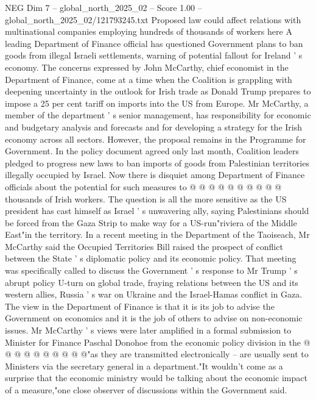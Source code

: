 \begin{textsample}{NEG Dim 7 – global\_north\_2025\_02 – Score 1.00 – global\_north\_2025\_02/121793245.txt}  \label{ex:f7_neg_176}
Proposed law could affect relations with multinational companies employing hundreds of thousands of workers here A leading Department of Finance official has questioned Government plans to ban goods from illegal Israeli settlements, warning of potential fallout for Ireland ' s economy.
The concerns expressed by John McCarthy, chief economist in the Department of Finance, come at a time when the Coalition is grappling with deepening uncertainty in the outlook for Irish trade as Donald Trump prepares to impose a 25 per cent tariff on imports into the US from Europe.
Mr McCarthy, a member of the department ' s senior management, has responsibility for economic and budgetary analysis and forecasts and for developing a strategy for the Irish economy across all sectors.
However, the proposal remains in the Programme for Government.
In the policy document agreed only last month, Coalition leaders pledged to progress new laws to ban imports of goods from Palestinian territories illegally occupied by Israel.
Now there is disquiet among Department of Finance officials about the potential for such measures to @ @ @ @ @ @ @ @ @ @ thousands of Irish workers.
The question is all the more sensitive as the US president has cast himself as Israel ' s unwavering ally, saying Palestinians should be forced from the Gaza Strip to make way for a US-run"riviera of the Middle East"in the territory.
In a recent meeting in the Department of the Taoiseach, Mr McCarthy said the Occupied Territories Bill raised the prospect of conflict between the State ' s diplomatic policy and its economic policy.
That meeting was specifically called to discuss the Government ' s response to Mr Trump ' s abrupt policy U-turn on global trade, fraying relations between the US and its western allies, Russia ' s war on Ukraine and the Israel-Hamas conflict in Gaza.
The view in the Department of Finance is that it is its job to advise the Government on economics and it is the job of others to advise on non-economic issues.
Mr McCarthy ' s views were later amplified in a formal submission to Minister for Finance Paschal Donohoe from the economic policy division in the @ @ @ @ @ @ @ @ @ @"as they are transmitted electronically -- are usually sent to Ministers via the secretary general in a department."It wouldn't come as a surprise that the economic ministry would be talking about the economic impact of a measure,"one close observer of discussions within the Government said.

\end{textsample}
